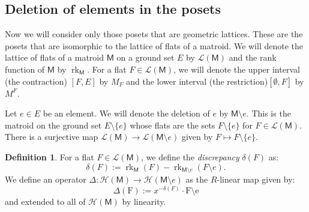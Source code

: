 \documentclass[12pt,letterpaper,english]{amsart}
\theoremstyle{teoremas}
\theoremstyle{definition}
\newtheorem{definition}[theorem]{Definition}
\newcommand{\M}{\mathsf{M}}
\newcommand{\rank}{\operatorname{rk}}
\newcommand{\cH}{\mathcal{H}}
\newcommand{\calL}{\mathcal{L}}
\newcommand{\Ebasis}[1]{\mathrm{#1}}
\begin{document}
\subsection{Deletion of elements in the posets}
Now we will consider only those posets that are geometric lattices.
These are the posets that are isomorphic to the lattice of flats of a matroid.
We will denote the lattice of flats of a matroid \(\M\) on a ground set \(E\) by \(\mathcal{L}(\M)\)
and the rank function of \(\M\) by \(\rank_{\M}\).
For a flat \(F \in \mathcal{L}(\M)\), we will denote the upper interval (the contraction)
\([F, E]\) by \(M_F\) and the lower interval (the restriction)\([\emptyset, F]\) by \(M^F\).

Let \(e\in E\) be an element.
We will denote the deletion of \(e\) by \(\M \setminus e\). This is the matroid on the ground set \(E \setminus \{e\}\)
whose flats are the sets \(F \setminus \{e\}\) for \(F \in \mathcal{L}(\M)\).
There is a surjective map \(\calL(\M)\to\calL(\M\setminus e)\) given by \(F \mapsto F \setminus \{e\}\).

\begin{definition}
    For a flat \(F \in \calL(\M)\), we define the \emph{discrepancy} \(\delta(F)\) as:
    \[ \delta(F) := \rank_{\M}(F) - \rank_{\M\setminus e}(F \setminus e). \]
    We define an operator \(\Delta: \cH(\M) \to \cH(\M\setminus e)\) as the \(R\)-linear map given by:
    \[ \Delta(\Ebasis{F}) := x^{-\delta(F)} \cdot \Ebasis{F \setminus e}\]
    and extended to all of \(\cH(\M)\) by linearity.
\end{definition}
\end{document}

